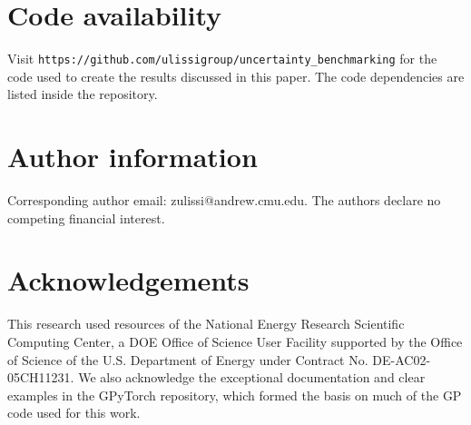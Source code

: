 \documentclass[]{achemso}
\begin{document}
\section*{Code availability} Visit \texttt{https://github.com/ulissigroup/uncertainty\_benchmarking} for the code used to create the results discussed in this paper.
The code dependencies are listed inside the repository.

\section*{Author information} Corresponding author email:  zulissi@andrew.cmu.edu.
The authors declare no competing financial interest.

\section*{Acknowledgements} This research used resources of the National Energy Research Scientific Computing Center, a DOE Office of Science User Facility supported by the Office of Science of the U.S. Department of Energy under Contract No. DE-AC02-05CH11231. %
We also acknowledge the exceptional documentation and clear examples in the GPyTorch\cite{Gardner2018} repository, which formed the basis on much of the \gls{GP} code used for this work.



\clearpage

\end{document}
